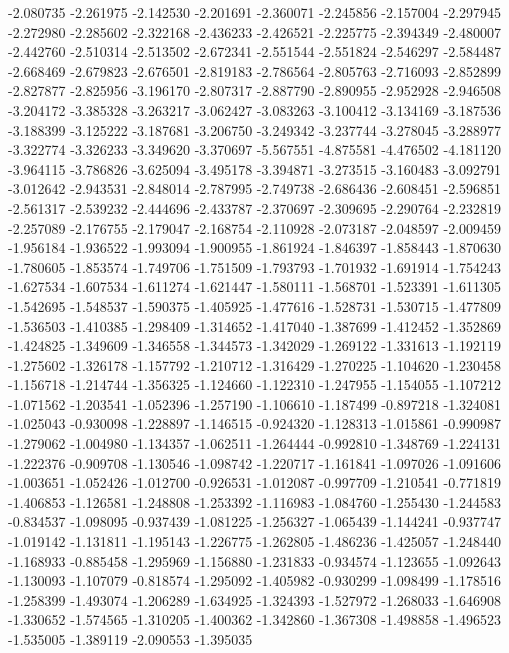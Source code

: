 -2.080735
-2.261975
-2.142530
-2.201691
-2.360071
-2.245856
-2.157004
-2.297945
-2.272980
-2.285602
-2.322168
-2.436233
-2.426521
-2.225775
-2.394349
-2.480007
-2.442760
-2.510314
-2.513502
-2.672341
-2.551544
-2.551824
-2.546297
-2.584487
-2.668469
-2.679823
-2.676501
-2.819183
-2.786564
-2.805763
-2.716093
-2.852899
-2.827877
-2.825956
-3.196170
-2.807317
-2.887790
-2.890955
-2.952928
-2.946508
-3.204172
-3.385328
-3.263217
-3.062427
-3.083263
-3.100412
-3.134169
-3.187536
-3.188399
-3.125222
-3.187681
-3.206750
-3.249342
-3.237744
-3.278045
-3.288977
-3.322774
-3.326233
-3.349620
-3.370697
-5.567551
-4.875581
-4.476502
-4.181120
-3.964115
-3.786826
-3.625094
-3.495178
-3.394871
-3.273515
-3.160483
-3.092791
-3.012642
-2.943531
-2.848014
-2.787995
-2.749738
-2.686436
-2.608451
-2.596851
-2.561317
-2.539232
-2.444696
-2.433787
-2.370697
-2.309695
-2.290764
-2.232819
-2.257089
-2.176755
-2.179047
-2.168754
-2.110928
-2.073187
-2.048597
-2.009459
-1.956184
-1.936522
-1.993094
-1.900955
-1.861924
-1.846397
-1.858443
-1.870630
-1.780605
-1.853574
-1.749706
-1.751509
-1.793793
-1.701932
-1.691914
-1.754243
-1.627534
-1.607534
-1.611274
-1.621447
-1.580111
-1.568701
-1.523391
-1.611305
-1.542695
-1.548537
-1.590375
-1.405925
-1.477616
-1.528731
-1.530715
-1.477809
-1.536503
-1.410385
-1.298409
-1.314652
-1.417040
-1.387699
-1.412452
-1.352869
-1.424825
-1.349609
-1.346558
-1.344573
-1.342029
-1.269122
-1.331613
-1.192119
-1.275602
-1.326178
-1.157792
-1.210712
-1.316429
-1.270225
-1.104620
-1.230458
-1.156718
-1.214744
-1.356325
-1.124660
-1.122310
-1.247955
-1.154055
-1.107212
-1.071562
-1.203541
-1.052396
-1.257190
-1.106610
-1.187499
-0.897218
-1.324081
-1.025043
-0.930098
-1.228897
-1.146515
-0.924320
-1.128313
-1.015861
-0.990987
-1.279062
-1.004980
-1.134357
-1.062511
-1.264444
-0.992810
-1.348769
-1.224131
-1.222376
-0.909708
-1.130546
-1.098742
-1.220717
-1.161841
-1.097026
-1.091606
-1.003651
-1.052426
-1.012700
-0.926531
-1.012087
-0.997709
-1.210541
-0.771819
-1.406853
-1.126581
-1.248808
-1.253392
-1.116983
-1.084760
-1.255430
-1.244583
-0.834537
-1.098095
-0.937439
-1.081225
-1.256327
-1.065439
-1.144241
-0.937747
-1.019142
-1.131811
-1.195143
-1.226775
-1.262805
-1.486236
-1.425057
-1.248440
-1.168933
-0.885458
-1.295969
-1.156880
-1.231833
-0.934574
-1.123655
-1.092643
-1.130093
-1.107079
-0.818574
-1.295092
-1.405982
-0.930299
-1.098499
-1.178516
-1.258399
-1.493074
-1.206289
-1.634925
-1.324393
-1.527972
-1.268033
-1.646908
-1.330652
-1.574565
-1.310205
-1.400362
-1.342860
-1.367308
-1.498858
-1.496523
-1.535005
-1.389119
-2.090553
-1.395035
